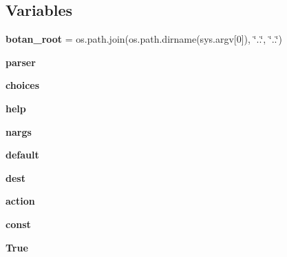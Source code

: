 \subsection*{Variables}
\begin{DoxyCompactItemize}
\item 
\mbox{\label{namespaceshow__dependencies_adb9f675edc54212f8f7bec1889179be6}} 
{\bfseries botan\+\_\+root} = os.\+path.\+join(os.\+path.\+dirname(sys.\+argv\mbox{[}0\mbox{]}), \char`\"{}..\char`\"{}, \char`\"{}..\char`\"{})
\item 
{\bfseries parser}
\item 
\mbox{\label{namespaceshow__dependencies_a84cd45a016e662f7f8a03d4c8780067a}} 
{\bfseries choices}
\item 
\mbox{\label{namespaceshow__dependencies_a5f1dbc9258abd847abcefa3b720548bf}} 
{\bfseries help}
\item 
\mbox{\label{namespaceshow__dependencies_a7a702c47f9aa0285097083505bfc90a9}} 
{\bfseries nargs}
\item 
\mbox{\label{namespaceshow__dependencies_aca3646de35aa71d6a0532b8c67cdd204}} 
{\bfseries default}
\item 
\mbox{\label{namespaceshow__dependencies_ab066d3e3bd28b4e5559240905de32b78}} 
{\bfseries dest}
\item 
\mbox{\label{namespaceshow__dependencies_a409506948a1ebfa5cf8da70ac798b160}} 
{\bfseries action}
\item 
\mbox{\label{namespaceshow__dependencies_ae23834629db267ef21002d70c789500a}} 
{\bfseries const}
\item 
\mbox{\label{namespaceshow__dependencies_a00de73d376cdcca602e6a73891ef7409}} 
{\bfseries True}
\item 
\mbox{\label{namespaceshow__dependencies_adaf832b6fa55b37a2652c9e7581df4e2}} 

\end{DoxyCompactItemize}
